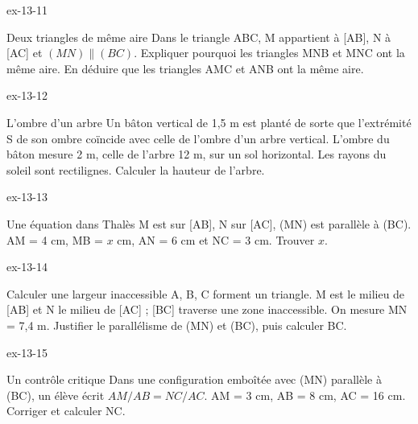 \clearpage{}
\begin{blocLivre}{ex-13-11}\begin{exercice}[3]{Deux triangles de même aire}
Dans le triangle ABC, M appartient à [AB], N à [AC] et $(MN)\parallel(BC)$. Expliquer pourquoi les triangles MNB et MNC ont la même aire. En déduire que les triangles AMC et ANB ont la même aire.
\label{fig-ex-13-11}
\end{exercice}\end{blocLivre}
\begin{blocLivre}{ex-13-12}\begin{exercice}[3]{L’ombre d’un arbre}
Un bâton vertical de 1,5 m est planté de sorte que l’extrémité S de son ombre coïncide avec celle de l’ombre d’un arbre vertical. L’ombre du bâton mesure 2 m, celle de l’arbre 12 m, sur un sol horizontal. Les rayons du soleil sont rectilignes. Calculer la hauteur de l’arbre.
\label{fig-ex-13-12}
\end{exercice}\end{blocLivre}
\begin{blocLivre}{ex-13-13}\begin{exercice}[3]{Une équation dans Thalès}
M est sur [AB], N sur [AC], (MN) est parallèle à (BC). AM = 4 cm, MB = $x$ cm, AN = 6 cm et NC = 3 cm. Trouver $x$.
\label{fig-ex-13-13}
\end{exercice}\end{blocLivre}
\begin{blocLivre}{ex-13-14}\begin{exercice}[3]{Calculer une largeur inaccessible}
A, B, C forment un triangle. M est le milieu de [AB] et N le milieu de [AC] ; [BC] traverse une zone inaccessible. On mesure MN = 7,4 m. Justifier le parallélisme de (MN) et (BC), puis calculer BC.
\label{fig-ex-13-14}
\end{exercice}\end{blocLivre}
\begin{blocLivre}{ex-13-15}\begin{exercice}[3]{Un contrôle critique}
Dans une configuration emboîtée avec (MN) parallèle à (BC), un élève écrit $AM/AB=NC/AC$. AM = 3 cm, AB = 8 cm, AC = 16 cm. Corriger et calculer NC.
\label{fig-ex-13-15}
\end{exercice}\end{blocLivre}

\clearpage
